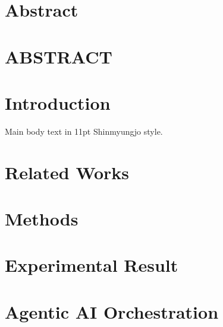 \documentclass[12pt]{report}
\begin{document}


\newpage


\newpage


\newpage


\newpage
\chapter*{Abstract}


\newpage
\chapter*{ABSTRACT}



\chapter{Introduction}
Main body text in 11pt Shinmyungjo style.


\chapter{Related Works}


\chapter{Methods}


\chapter{Experimental Result}


\chapter{Agentic AI Orchestration}


\end{document}
